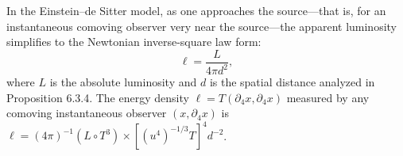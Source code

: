 In the Einstein--de Sitter model, as one approaches the source---that is, for an instantaneous comoving observer very near the source---the apparent luminosity simplifies to the Newtonian inverse-square law form:
$$\ell = \frac{L}{4\pi d^2},$$
where $L$ is the absolute luminosity and $d$ is the spatial distance analyzed in Proposition 6.3.4. The energy density $\ell = T(\partial_4 x, \partial_4 x)$ measured by any comoving instantaneous observer $(x, \partial_4 x)$ is $\ell = (4\pi)^{-1}(L \circ T^3) \times [(u^4)^{-1/3} T]^4 d^{-2}$.
